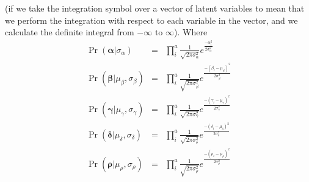 \documentclass[11pt]{article}
\begin{document}
\begin{compactenum}
{	\normalsize
	(if we take the integration symbol over a vector of latent variables to mean that we perform the integration with respect to each variable in the vector, and we calculate the definite integral from $-\infty$ to $\infty$).
	Where
	\begin{eqnarray*}
		\Pr(\bm\alpha|\sigma_{\alpha}) & = & \prod_i^{a}\frac{1}{\sqrt{2\pi\sigma_{\alpha}^2}}e^{\frac{-\alpha_i^2}{2\sigma_{\alpha}^2}}\\
		\Pr(\bm\beta|\mu_{\beta},\sigma_{\beta}) & = & \prod_i^{a}\frac{1}{\sqrt{2\pi\sigma_{\beta}^2}}e^{\frac{-(\beta_i-\mu_{\beta})^2}{2\sigma_{\beta}^2}}\\
		\Pr(\bm\gamma|\mu_{\gamma},\sigma_{\gamma}) & = & \prod_i^{a}\frac{1}{\sqrt{2\pi\sigma_{\gamma}^2}}e^{\frac{-(\gamma_i-\mu_{\gamma})^2}{2\sigma_{\gamma}^2}}\\
		\Pr(\bm\delta|\mu_{\delta},\sigma_{\delta}) & = & \prod_i^{a}\frac{1}{\sqrt{2\pi\sigma_{\delta}^2}}e^{\frac{-(\delta_i-\mu_{\delta})^2}{2\sigma_{\delta}^2}}\\
		\Pr(\bm\rho|\mu_{\rho},\sigma_{\rho}) & = & \prod_i^{a}\frac{1}{\sqrt{2\pi\sigma_{\rho}^2}}e^{\frac{-(\rho_i-\mu_{\rho})^2}{2\sigma_{\rho}^2}}\\\end{eqnarray*}
	}
	\newpage
	\large
\end{compactenum}
\end{document}
